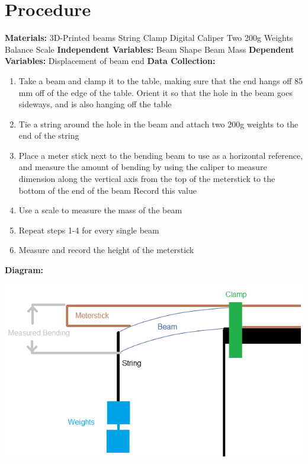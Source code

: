 \documentclass{article}
\begin{document}
\section*{Procedure}
\textbf{Materials:}\newline
3D-Printed beams\newline
String\newline
Clamp\newline
Digital Caliper\newline
Two 200g Weights\newline
Balance Scale\newline
\newline
\textbf{Independent Variables:}\newline
Beam Shape \newline
Beam Mass \newline
\newline
\textbf{Dependent Variables:}\newline
Displacement of beam end\newline
\newline
\textbf{Data Collection:}\newline
\begin{enumerate}
\item 
Take a beam and clamp it to the table, making sure that the end hangs off 85 mm off of the edge of the table. Orient it so that the hole in the beam goes sideways, and is also hanging off the table
\item
Tie a string around the hole in the beam and attach two 200g weights to the end of the string
\item
Place a meter stick next to the bending beam to use as a horizontal reference, and measure the amount of bending by using the caliper to measure dimension along the vertical axis from the top of the meterstick to the bottom of the end of the beam
Record this value
\item
Use a scale to measure the mass of the beam
\item
Repeat steps 1-4 for every single beam
\item
Measure and record the height of the meterstick
\end{enumerate}
\textbf{Diagram:}\newline
\begin{center}
	\includegraphics[width=.8\linewidth]{whysicDiagram.png}
\end{center}
\end{document}
